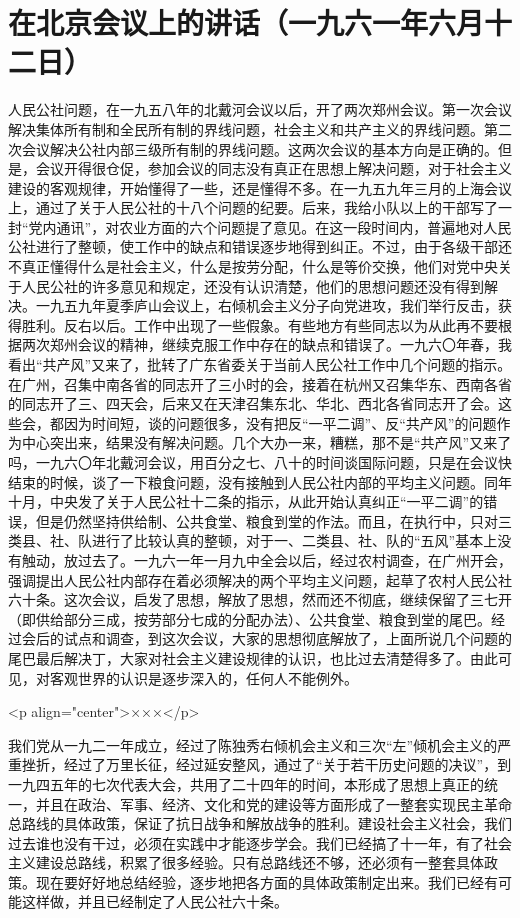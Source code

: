 \section{在北京会议上的讲话（一九六一年六月十二日）}


人民公社问题，在一九五八年的北戴河会议以后，开了两次郑州会议。第一次会议解决集体所有制和全民所有制的界线问题，社会主义和共产主义的界线问题。第二次会议解决公社内部三级所有制的界线问题。这两次会议的基本方向是正确的。但是，会议开得很仓促，参加会议的同志没有真正在思想上解决问题，对于社会主义建设的客观规律，开始懂得了一些，还是懂得不多。在一九五九年三月的上海会议上，通过了关于人民公社的十八个问题的纪要。后来，我给小队以上的干部写了一封“党内通讯”，对农业方面的六个问题提了意见。在这一段时间内，普遍地对人民公社进行了整顿，使工作中的缺点和错误逐步地得到纠正。不过，由于各级干部还不真正懂得什么是社会主义，什么是按劳分配，什么是等价交换，他们对党中央关于人民公社的许多意见和规定，还没有认识清楚，他们的思想问题还没有得到解决。一九五九年夏季庐山会议上，右倾机会主义分子向党进攻，我们举行反击，获得胜利。反右以后。工作中出现了一些假象。有些地方有些同志以为从此再不要根据两次郑州会议的精神，继续克服工作中存在的缺点和错误了。一九六〇年春，我看出“共产风”又来了，批转了广东省委关于当前人民公社工作中几个问题的指示。在广州，召集中南各省的同志开了三小时的会，接着在杭州又召集华东、西南各省的同志开了三、四天会，后来又在天津召集东北、华北、西北各省同志开了会。这些会，都因为时间短，谈的问题很多，没有把反“一平二调”、反“共产风”的问题作为中心突出来，结果没有解决问题。几个大办一来，糟糕，那不是“共产风”又来了吗，一九六〇年北戴河会议，用百分之七、八十的时间谈国际问题，只是在会议快结束的时候，谈了一下粮食问题，没有接触到人民公社内部的平均主义问题。同年十月，中央发了关于人民公社十二条的指示，从此开始认真纠正“一平二调”的错误，但是仍然坚持供给制、公共食堂、粮食到堂的作法。而且，在执行中，只对三类县、社、队进行了比较认真的整顿，对于一、二类县、社、队的“五风”基本上没有触动，放过去了。一九六一年一月九中全会以后，经过农村调查，在广州开会，强调提出人民公社内部存在着必须解决的两个平均主义问题，起草了农村人民公社六十条。这次会议，启发了思想，解放了思想，然而还不彻底，继续保留了三七开（即供给部分三成，按劳部分七成的分配办法）、公共食堂、粮食到堂的尾巴。经过会后的试点和调查，到这次会议，大家的思想彻底解放了，上面所说几个问题的尾巴最后解决丁，大家对社会主义建设规律的认识，也比过去清楚得多了。由此可见，对客观世界的认识是逐步深入的，任何人不能例外。

<p align="center">×××</p>

我们党从一九二一年成立，经过了陈独秀右倾机会主义和三次“左”倾机会主义的严重挫折，经过了万里长征，经过延安整风，通过了“关于若干历史问题的决议”，到一九四五年的七次代表大会，共用了二十四年的时间，本形成了思想上真正的统一，并且在政治、军事、经济、文化和党的建设等方面形成了一整套实现民主革命总路线的具体政策，保证了抗日战争和解放战争的胜利。建设社会主义社会，我们过去谁也没有干过，必须在实践中才能逐步学会。我们已经搞了十一年，有了社会主义建设总路线，积累了很多经验。只有总路线还不够，还必须有一整套具体政策。现在要好好地总结经验，逐步地把各方面的具体政策制定出来。我们已经有可能这样做，并且已经制定了人民公社六十条。

